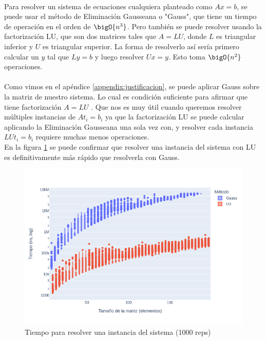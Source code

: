 \documentclass[12pt]{article}
\begin{document}
\paragraph{} Para resolver un sistema de ecuaciones cualquiera planteado como \(Ax = b\), se puede usar el método de Eliminación Gausseana o "Gauss", que tiene un tiempo de operación en el orden de \(\bigO{n^3}\). Pero también se puede resolver usando la factorización LU, que son dos matrices tales que \(A = LU\), donde \(L\) es triangular inferior y \(U\) es triangular superior. La forma de resolverlo así sería primero calcular un \(y\) tal que \(Ly = b\) y luego resolver \(Ux = y\). Esto toma \(\bigO{n^2}\) operaciones.
\paragraph{} Como vimos en el apéndice \ref{appendix:justificacion}, se puede aplicar Gauss sobre la matriz de nuestro sistema. Lo cual es condición suficiente para afirmar que tiene factorización \(A = LU\) \cite{clases}. Que nos es muy útil cuando queremos resolver múltiples instancias de \(At_i = b_i\) ya que la factorización LU se puede calcular aplicando la Eliminación Gausseana una sola vez con, y resolver cada instancia \(LUt_i = b_i\) requiere muchas menos operaciones. \\
En la figura \ref{fig:solve.time} se puede confirmar que resolver una instancia del sistema con LU es definitivamente más rápido que resolverla con Gauss. 

\begin{figure}[H]
\centering
\includegraphics[scale=0.5]{times.1.t_solve}
\caption{Tiempo para resolver una instancia del sistema (1000 reps)}
\label{fig:solve.time}
\end{figure}
\end{document}
